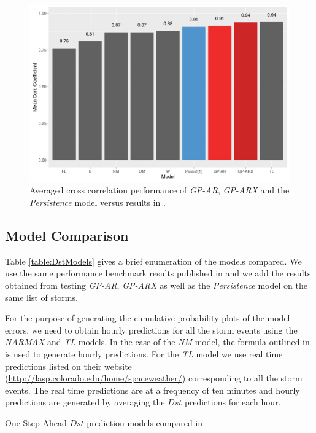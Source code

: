 \documentclass[referee,a4paper,12pt,traditabstract]{swsc}
\begin{document}
\begin{linenumbers}
\begin{figure}
   \centering
   \includegraphics[width=\textwidth]{Compare_CC.png}
      \caption{Averaged cross correlation performance of \emph{GP-AR}, \emph{GP-ARX} and the \emph{Persistence} model versus results in \citet{Ji2012}.}
         \label{fig:cc}
\end{figure}

\subsection{Model Comparison}

Table \ref{table:DstModels} gives a brief enumeration of the models compared. We use the same performance benchmark results published in \citet{Ji2012} and we add the results obtained from testing \emph{GP-AR}, \emph{GP-ARX} as well as the \emph{Persistence} model on the same list of storms. 

For the purpose of generating the cumulative probability plots of the model errors, we need to obtain hourly predictions for all the storm events using the \emph{NARMAX} and \emph{TL} models. In the case of the \emph{NM} model, the formula outlined in \citet{balikhin:narmax} is used to generate hourly predictions. For the \emph{TL} model we use real time predictions listed on their website (\url{http://lasp.colorado.edu/home/spaceweather/}) corresponding to all the storm events. The real time predictions are at a frequency of ten minutes and hourly predictions are generated by averaging the $Dst$ predictions for each hour.

\begin{table}
      \caption[]{One Step Ahead $Dst$ prediction models compared in \citet{Ji2012}}
         \label{table:DstModels}
      

\end{table}
\end{linenumbers}
\end{document}
